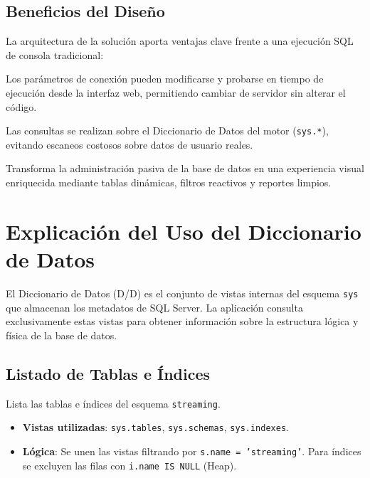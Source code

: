 \documentclass[11pt,a4paper]{article}
\begin{document}
\subsection{Beneficios del Diseño}
La arquitectura de la solución aporta ventajas clave frente a una ejecución SQL de consola tradicional:
\begin{description}[leftmargin=2.8cm, labelwidth=2.5cm, style=sameline, font=\bfseries\color{ucvblue}]
    \item[Portabilidad] Los parámetros de conexión pueden modificarse y probarse en tiempo de ejecución desde la interfaz web, permitiendo cambiar de servidor sin alterar el código.
    \item[Eficiencia] Las consultas se realizan sobre el Diccionario de Datos del motor (\texttt{sys.*}), evitando escaneos costosos sobre datos de usuario reales.
    \item[Interactividad] Transforma la administración pasiva de la base de datos en una experiencia visual enriquecida mediante tablas dinámicas, filtros reactivos y reportes limpios.
\end{description}

\newpage

\section{Explicación del Uso del Diccionario de Datos}
El Diccionario de Datos (D/D) es el conjunto de vistas internas del esquema \texttt{sys} que almacenan los metadatos de SQL Server. La aplicación consulta exclusivamente estas vistas para obtener información sobre la estructura lógica y física de la base de datos.

\subsection{Listado de Tablas e Índices}
Lista las tablas e índices del esquema \texttt{streaming}.
\begin{itemize}
    \item \textbf{Vistas utilizadas}: \texttt{sys.tables}, \texttt{sys.schemas}, \texttt{sys.indexes}.
    \item \textbf{Lógica}: Se unen las vistas filtrando por \texttt{s.name = 'streaming'}. Para índices se excluyen las filas con \texttt{i.name IS NULL} (Heap).
\end{itemize}
\end{document}
